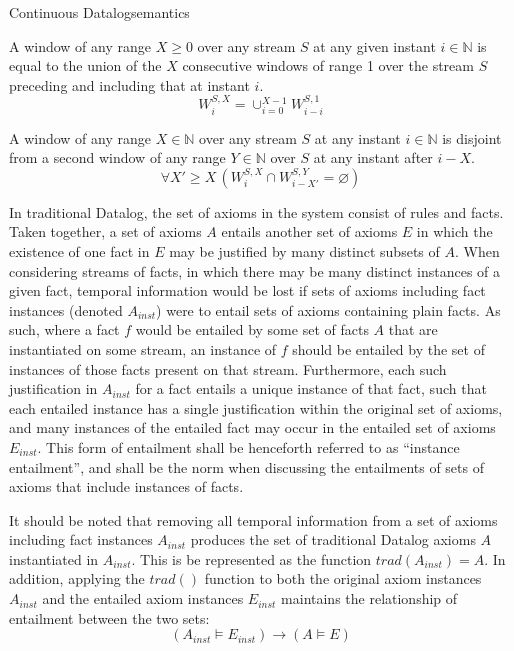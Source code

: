 \begin{nestedsection}{Continuous Datalog}{semantics}
\begin{axiom}\label{axiom:continuous datalog: window composition}
A window of any range ${X \ge 0}$ over any stream $S$ at any
given instant ${i \in \mathbb{N}}$ is equal to the union of the
$X$ consecutive windows of range 1 over the stream $S$ preceding and
including that at instant $i$.
\begin{equation*}
W^{S,X}_{i} = \mathop{\cup}_{i=0}^{X-1} W^{S,1}_{i-i}
\end{equation*}
\end{axiom}

\begin{axiom}\label{axiom:continuous datalog: window disjointness}
A window of any range ${X \in \mathbb{N}}$ over any stream $S$ at any
instant ${i \in \mathbb{N}}$ is disjoint from a second window of any
range ${Y \in \mathbb{N}}$ over $S$ at any instant after ${i - X}$.
\begin{equation*}
\forall X' \geq X \, \left( W^{S,X}_{i} \cap W^{S,Y}_{i-X'} = \varnothing \right)
\end{equation*}
\end{axiom}

In traditional Datalog, the set of axioms in the system consist of
rules and facts. Taken together, a set of axioms $A$ entails another
set of axioms $E$ in which the existence of one fact in $E$ may be
justified by many distinct subsets of $A$.  When considering streams
of facts, in which there may be many distinct instances of a given
fact, temporal information would be lost if sets of axioms including
fact instances (denoted $A_{inst}$) were to entail sets of axioms
containing plain facts.  As such, where a fact $f$ would be entailed
by some set of facts $A$ that are instantiated on some stream, an
instance of $f$ should be entailed by the set of instances of those
facts present on that stream.  Furthermore, each such justification in
$A_{inst}$ for a fact entails a unique instance of that fact, such
that each entailed instance has a single justification within the
original set of axioms, and many instances of the entailed fact may
occur in the entailed set of axioms $E_{inst}$.  This form of
entailment shall be henceforth referred to as ``instance entailment'',
and shall be the norm when discussing the entailments of sets of
axioms that include instances of facts.
	
	It should be noted that removing all temporal information from a set of axioms including fact instances $A_{inst}$ produces the set of traditional Datalog axioms $A$ instantiated in $A_{inst}$.
	This is be represented as the function ${trad\left( A_{inst} \right) = A}$.
	In addition, applying the ${trad()}$ function to both the original axiom instances $A_{inst}$ and the entailed axiom instances $E_{inst}$ maintains the relationship of entailment between the two sets:
	\[ \left( A_{inst} \vDash E_{inst} \right) \rightarrow \left( A \vDash E \right) \]


\end{nestedsection}
